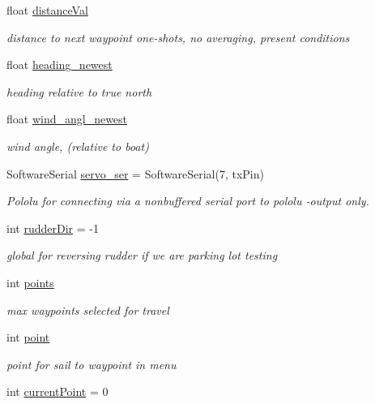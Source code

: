 \begin{DoxyCompactItemize}
float \hyperlink{group__group1_ga90176c4024ce3ce161b5feda285f97c5}{distance\-Val}
\begin{DoxyCompactList}\small\item\em distance to next waypoint one-\/shots, no averaging, present conditions \end{DoxyCompactList}\item 
float \hyperlink{group__group1_ga3c596663ba52aec96df1f504772914be}{heading\-\_\-newest}
\begin{DoxyCompactList}\small\item\em heading relative to true north \end{DoxyCompactList}\item 
float \hyperlink{group__group1_ga9fcee93bab7f0c81f67b99f8b8597e9c}{wind\-\_\-angl\-\_\-newest}
\begin{DoxyCompactList}\small\item\em wind angle, (relative to boat) \end{DoxyCompactList}\item 
\-Software\-Serial \hyperlink{group__group1_gad08dcd7d87414b8d7f7e9cf2689ea5d8}{servo\-\_\-ser} = \-Software\-Serial(7, tx\-Pin)
\begin{DoxyCompactList}\small\item\em \-Pololu for connecting via a nonbuffered serial port to pololu -\/output only. \end{DoxyCompactList}\item 
int \hyperlink{group__group1_gaf79de3204853b3b4101113683e74cd54}{rudder\-Dir} = -\/1
\begin{DoxyCompactList}\small\item\em global for reversing rudder if we are parking lot testing \end{DoxyCompactList}\item 
int \hyperlink{group__group1_gaf7f8f4a4e39e09fdb5e9f02330ecabef}{points}
\begin{DoxyCompactList}\small\item\em max waypoints selected for travel \end{DoxyCompactList}\item 
int \hyperlink{group__group1_ga2dee8b7fcecc7c2d190e9304b43ea886}{point}
\begin{DoxyCompactList}\small\item\em point for sail to waypoint in menu \end{DoxyCompactList}\item 
int \hyperlink{group__group1_ga9c43dea25777e23791d530b06f6715f1}{current\-Point} = 0

\end{DoxyCompactItemize}
